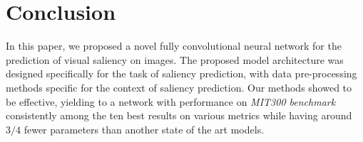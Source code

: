 \documentclass[10pt,twocolumn,letterpaper]{article}
\begin{document}
\section{Conclusion}
In this paper, we proposed a novel fully convolutional neural network for the
prediction of visual saliency on images.
The proposed model architecture was designed specifically
for the task of saliency prediction, with data pre-processing methods
specific for the context of saliency prediction.
Our methods showed to be effective, yielding to a network with performance
on \emph{MIT300 benchmark} consistently among the ten best results on various
metrics while having around $3/4$  fewer parameters than another state of
the art models.

{\small


}
\end{document}
